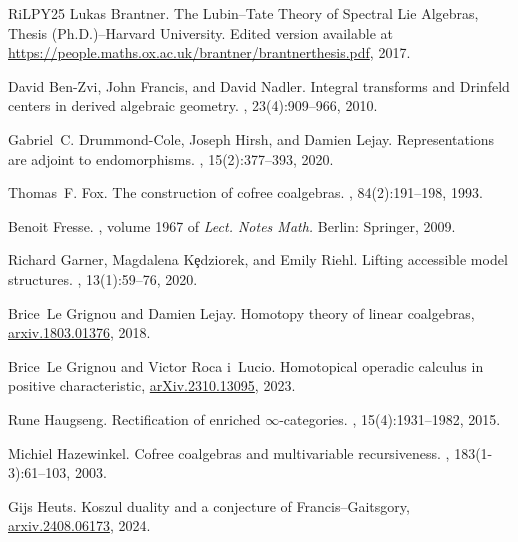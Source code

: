 \documentclass[a4paper,12pt]{amsart}
\theoremstyle{plain}
\theoremstyle{definition}
\theoremstyle{remark}
\begin{document}
\begin{thebibliography}{RiLPY25}
Lukas Brantner. 
\newblock The {L}ubin--{T}ate {T}heory of {S}pectral {L}ie Algebras, {T}hesis
  ({P}h.{D}.)--{H}arvard {U}niversity. Edited version available at
  \href{https://people.maths.ox.ac.uk/brantner/brantnerthesis.pdf}{https://people.maths.ox.ac.uk/brantner/brantnerthesis.pdf},
  2017.  

David Ben-Zvi, John Francis, and David Nadler.
\newblock Integral transforms and {D}rinfeld centers in derived algebraic
  geometry.
, 23(4):909--966, 2010.

Gabriel~C. Drummond-Cole, Joseph Hirsh, and Damien Lejay.
\newblock Representations are adjoint to endomorphisms.
, 15(2):377--393, 2020.

Thomas~F. Fox.
\newblock The construction of cofree coalgebras.
, 84(2):191--198, 1993.

Benoit Fresse.
, volume 1967 of {\em Lect.
  Notes Math.}
\newblock Berlin: Springer, 2009.

Richard Garner, Magdalena K{\c{e}}dziorek, and Emily Riehl.
\newblock Lifting accessible model structures.
, 13(1):59--76, 2020.

Brice~Le Grignou and Damien Lejay.
\newblock Homotopy theory of linear coalgebras,
  \href{https://arxiv.org/abs/1803.01376}{arxiv.1803.01376}, 2018.

Brice~Le Grignou and Victor {R}oca {i}~{L}ucio.
\newblock Homotopical operadic calculus in positive characteristic,
  \href{https://arxiv.org/abs/2310.13095}{arXiv.2310.13095}, 2023.

Rune Haugseng.
\newblock Rectification of enriched {$\infty$}-categories.
, 15(4):1931--1982, 2015.

Michiel Hazewinkel.
\newblock Cofree coalgebras and multivariable recursiveness.
, 183(1-3):61--103, 2003.

Gijs Heuts.
\newblock Koszul duality and a conjecture of {F}rancis--{G}aitsgory,
  \href{https://arxiv.org/pdf/2408.06173}{arxiv.2408.06173}, 2024.


\end{thebibliography}
\end{document}
